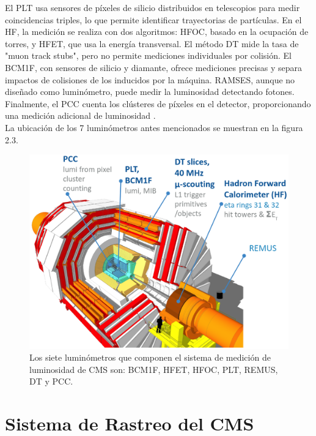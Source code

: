 El PLT usa sensores de píxeles de silicio distribuidos en telescopios para medir coincidencias triples, lo que permite identificar trayectorias de partículas. En el HF, la medición se realiza con dos algoritmos: HFOC, basado en la ocupación de torres, y HFET, que usa la energía transversal. El método DT mide la tasa de "muon track stubs", pero no permite mediciones individuales por colisión. El BCM1F, con sensores de silicio y diamante, ofrece mediciones precisas y separa impactos de colisiones de los inducidos por la máquina. RAMSES, aunque no diseñado como luminómetro, puede medir la luminosidad detectando fotones. Finalmente, el PCC cuenta los clústeres de píxeles en el detector, proporcionando una medición adicional de luminosidad \cite{pas_18}.\\

La ubicación de los 7 luminómetros antes mencionados se muestran en la figura 2.3.\\

\begin{center}
  \begin{figure}[ht]
    \centering
    \includegraphics[scale=.3]{Chapter2/detectors.png}
    \caption[Luminómetros en CMS]{Los siete luminómetros que componen el sistema de medición de luminosidad de CMS son: BCM1F, HFET, HFOC, PLT, REMUS, DT y PCC.}
    \label{luminometers}
  \end{figure}
\end{center}

\section{Sistema de Rastreo del CMS}


